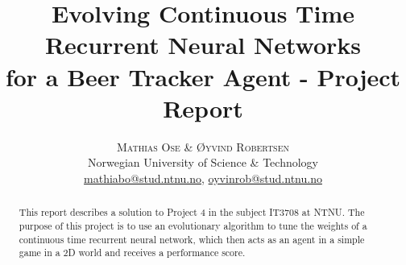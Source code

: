 \documentclass[twoside]{article}
\title{\vspace{-15mm}\fontsize{18pt}{10pt}\selectfont\textbf{Evolving Continuous Time Recurrent Neural Networks\\for a Beer Tracker Agent - Project Report}} %
\author{
    \large
    \textsc{Mathias Ose \& Øyvind Robertsen} \\ %
    \normalsize Norwegian University of Science \& Technology \\ %
    \normalsize \href{mailto:mathiabo@stud.ntnu.no}{mathiabo@stud.ntnu.no}, \href{mailto:oyvinrob@stud.ntnu.no}{oyvinrob@stud.ntnu.no} %
    \vspace{-5mm}
}
\date{}
\begin{document}
\maketitle %

\thispagestyle{fancy} %


\begin{abstract}

\noindent This report describes a solution to Project 4 in the subject IT3708 at NTNU. 
The purpose of this project is to use an evolutionary algorithm to tune the weights of a continuous time recurrent neural network, which then acts as an agent in a simple game in a 2D world and receives a performance score.
\end{abstract}

\end{document}

